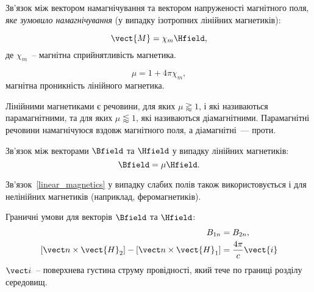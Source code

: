 \begin{Theory}
  Зв'язок між вектором намагнічування та вектором напруженості магнітного поля, \emph{яке зумовило намагнічування} (у випадку ізотропних лінійних магнетиків):

  \begin{equation}
	  \vect{M} = \chi_m\Hfield,
  \end{equation}
  де $\chi_m$~-- магнітна сприйнятливість магнетика.

  \begin{equation}
	  \mu = 1 + 4\pi\chi_m,
  \end{equation}
  магнітна проникність лінійного магнетика.
	
  Лінійними магнетиками є речовини, для яких $\mu \gtrapprox 1$, і які називаються  парамагнітними, та для яких $\mu \lessapprox 1$, які називаються діамагнітними. Парамагнітні речовини намагнічуюся вздовж магнітного поля, а діамагнітні~--- проти. 

	Зв'язок між векторами  $\Bfield$ та $\Hfield$ у випадку лінійних магнетиків:
	\begin{equation}\label{linear_magnetics}
		\Bfield = \mu \Hfield.
	\end{equation}

	Зв'язок~\ref{linear_magnetics} у випадку слабих полів також використовується і для нелінійних магнетиків (наприклад, феромагнетиків).
	
	
  Граничні умови для векторів $\Bfield$ та $\Hfield$:
  \begin{align}
	  B_{1n}                & = B_{2n},         \label{B_boundary}\\
	  \left[ \vect n \times \vect{H}_{2}\right]  - \left[ \vect n \times \vect{H}_{1}\right]  & = \frac{4\pi}{c}\vect{i} \label{H_boundary}
  \end{align}
  $\vect i$~-- поверхнева густина струму провідності, який тече по границі розділу середовищ.
\end{Theory}


%

